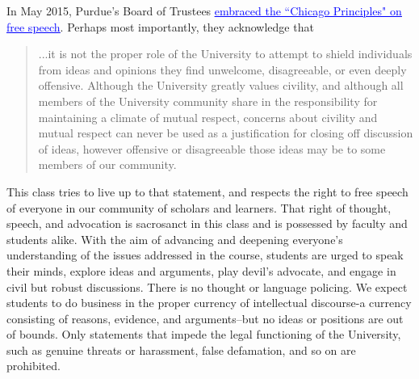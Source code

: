 \documentclass[a4paper]{article}
\begin{document}
In May 2015, Purdue's Board of Trustees \href{https://www.purdue.edu/purdue/about/free-speech.php}{\textcolor{blue}{\underline{embraced the ``Chicago Principles" on free speech}}}.   Perhaps most importantly, they acknowledge that 
\begin{quote}
...it is not the proper role of the University to attempt to shield individuals from ideas and  opinions they find unwelcome, disagreeable, or even deeply offensive. Although the University 
greatly values civility, and although all members of the University community share in the 
responsibility for maintaining a climate of mutual respect, concerns about civility and mutual respect 
can never be used as a justification for closing off discussion of ideas, however offensive or 
disagreeable those ideas may be to some members of our community.
\end{quote}

This class tries to live up to that statement, and respects the right to free speech of everyone in our community of scholars and learners.  That right of thought, speech, and advocation is sacrosanct in this class and is possessed by faculty and students alike.  With the aim of advancing and deepening everyone's understanding of the issues addressed in the course, students are urged to speak their minds, explore ideas and arguments, play devil's advocate, and engage in civil but robust discussions.  There is no thought or language policing.  We expect students to do business in the proper currency of intellectual discourse-a currency consisting of reasons, evidence, and arguments--but no ideas or positions are out of bounds.  Only statements that impede the legal functioning of the University, such as genuine threats or harassment, false defamation, and so on are prohibited.\\
\ \\
\end{document}
